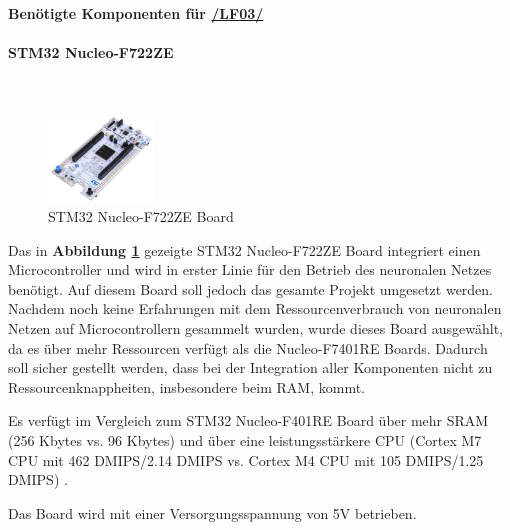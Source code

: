 \textbf{Benötigte Komponenten für \hyperlink{lf-nn-01}{/LF03/}} \\

\paragraph{STM32 Nucleo-F722ZE}\mbox{}\\

\begin{figure} %
	\vspace{-10pt}
	\hspace{20pt}
	\includegraphics[width=0.25\textwidth]{images/05_technische_spezifikation/nn/nucleo_f722ze.jpg}
	\caption{STM32 Nucleo-F722ZE Board}
	\label{fig:nucleo-f722ze}
\end{figure}


Das in \textbf{Abbildung \ref{fig:nucleo-f722ze}} gezeigte STM32 Nucleo-F722ZE Board integriert einen Microcontroller und wird in erster Linie für den Betrieb des neuronalen Netzes benötigt. Auf diesem Board soll jedoch das gesamte Projekt umgesetzt werden. Nachdem noch keine Erfahrungen mit dem Ressourcenverbrauch von neuronalen Netzen auf Microcontrollern gesammelt wurden, wurde dieses Board ausgewählt, da es über mehr Ressourcen verfügt als die Nucleo-F7401RE Boards. Dadurch soll sicher gestellt werden, dass bei der Integration aller Komponenten nicht zu Ressourcenknappheiten, insbesondere beim RAM, kommt.

Es verfügt im Vergleich zum STM32 Nucleo-F401RE Board über mehr SRAM (256 Kbytes vs. 96 Kbytes) und über eine leistungsstärkere CPU (Cortex M7 CPU mit 462 DMIPS/2.14 DMIPS vs. Cortex M4 CPU mit 105 DMIPS/1.25 DMIPS) \cite{stm32F7-board}. 

Das Board wird mit einer Versorgungsspannung von 5V betrieben. 
